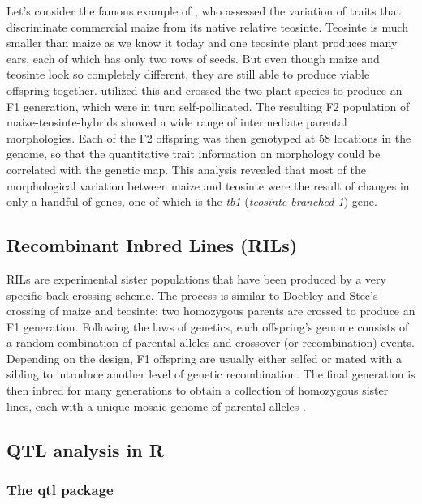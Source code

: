 \documentclass[12pt,]{krantz}
\theoremstyle{definition}
\theoremstyle{definition}
\theoremstyle{definition}
\theoremstyle{remark}
\begin{document}
Let's consider the famous example of \citet{Doebley285}, who assessed
the variation of traits that discriminate commercial maize from its
native relative teosinte. Teosinte is much smaller than maize as we know
it today and one teosinte plant produces many ears, each of which has
only two rows of seeds. But even though maize and teosinte look so
completely different, they are still able to produce viable offspring
together. \citet{Doebley285} utilized this and crossed the two plant
species to produce an F1 generation, which were in turn self-pollinated.
The resulting F2 population of maize-teosinte-hybrids showed a wide
range of intermediate parental morphologies. Each of the F2 offspring
was then genotyped at 58 locations in the genome, so that the
quantitative trait information on morphology could be correlated with
the genetic map. This analysis revealed that most of the morphological
variation between maize and teosinte were the result of changes in only
a handful of genes, one of which is the \emph{tb1} (\emph{teosinte
branched 1}) gene.

\subsection{Recombinant Inbred Lines
(RILs)}\label{recombinant-inbred-lines-rils}

RILs are experimental sister populations that have been produced by a
very specific back-crossing scheme. The process is similar to Doebley
and Stec's crossing of maize and teosinte: two homozygous parents are
crossed to produce an F1 generation. Following the laws of genetics,
each offspring's genome consists of a random combination of parental
alleles and crossover (or recombination) events. Depending on the
design, F1 offspring are usually either selfed or mated with a sibling
to introduce another level of genetic recombination. The final
generation is then inbred for many generations to obtain a collection of
homozygous sister lines, each with a unique mosaic genome of parental
alleles \citep{Pollard2012}.

\subsection{QTL analysis in R}\label{qtl-analysis-in-r}

\subsubsection{The qtl package}\label{the-qtl-package}
\end{document}
